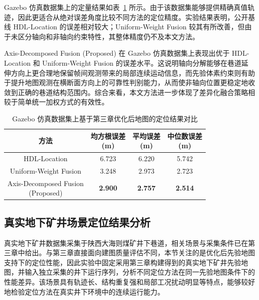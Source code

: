 Gazebo 仿真数据集上的定量结果如表~\ref{tab:ch4_gazebo_result} 所示。由于该数据集能够提供精确真值轨迹，因此更适合从绝对误差角度比较不同方法的定位精度。实验结果表明，公开基线 HDL-Location 的误差相对较大；Uniform-Weight Fusion 较其有所改善，但由于未区分轴向和非轴向约束特性，其整体精度仍不及本文方法。

Axis-Decomposed Fusion (Proposed) 在 Gazebo 仿真数据集上表现出优于 HDL-Location 和 Uniform-Weight Fusion 的误差水平。这说明轴向分解能够在巷道延伸方向上更合理地保留帧间观测带来的局部连续运动信息，而先验体素约束则有助于提升地图观测在横断面方向上的可靠性判别能力，从而使非轴向位置更稳定地收敛到正确的巷道结构范围内。综合来看，本文方法进一步体现了差异化融合策略相较于简单统一加权方式的有效性。

\begin{table}[htbp]
    \centering
    \caption{Gazebo 仿真数据集上基于第三章优化后地图的定位结果对比}
    \label{tab:ch4_gazebo_result}
    \small
    \renewcommand{\arraystretch}{1.15}
    \begin{tabular}{cccc}
        \toprule
        方法 & \shortstack{均方根误差\\(m)} & \shortstack{平均误差\\(m)} & \shortstack{中位数误差\\(m)} \\
        \midrule
        HDL-Location & 6.723 & 6.220 & 5.742 \\
        Uniform-Weight Fusion & 3.248 & 2.973 & 2.723 \\
        \shortstack{Axis-Decomposed Fusion\\(Proposed)} & \textbf{2.900} & \textbf{2.757} & \textbf{2.514} \\
        \bottomrule
    \end{tabular}
\end{table}

\subsection{真实地下矿井场景定位结果分析}

真实地下矿井数据集采集于陕西大海则煤矿井下巷道，相关场景与采集条件已在第三章中给出。与第三章直接面向建图质量评估不同，本节关注的是优化后先验地图支持下的定位性能，因此实验中固定采用第三章构建得到的真实地下矿井先验地图，并输入独立采集的井下运行序列，分析不同定位方法在同一先验地图条件下的性能差异。该场景具有轨迹长、结构重复强和局部工况扰动明显等特点，能够较好地检验定位方法在真实井下环境中的连续运行能力。

